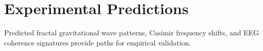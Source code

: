 \chapter{Experimental Predictions}

Predicted fractal gravitational wave patterns, Casimir frequency shifts, and EEG coherence signatures provide paths for empirical validation.
